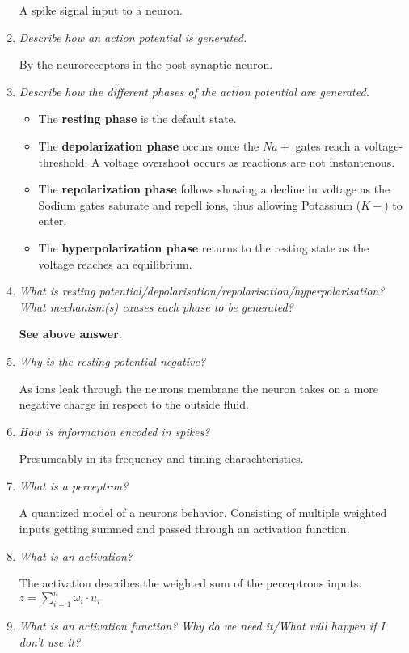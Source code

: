 \documentclass[
    fontsize      = 11pt,
    paper         = a4,
    twoside       = false,
    parskip       = half,
    pagesize      = false,
]{scrartcl}
\providecommand{\tightlist}{%
  \setlength{\itemsep}{0pt}\setlength{\parskip}{0pt}}
\begin{document}
\begin{enumerate}
  A spike signal input to a neuron.
\item
  \emph{Describe how an action potential is generated.}

  By the neuroreceptors in the post-synaptic neuron.
\item
  \emph{Describe how the different phases of the action potential are
  generated.}

  \begin{itemize}
  \tightlist
  \item
    The \textbf{resting phase} is the default state.
  \item
    The \textbf{depolarization phase} occurs once the \(Na+\) gates
    reach a voltage-threshold. A voltage overshoot occurs as reactions
    are not instantenous.
  \item
    The \textbf{repolarization phase} follows showing a decline in
    voltage as the Sodium gates saturate and repell ions, thus allowing
    Potassium (\(K-\)) to enter.
  \item
    The \textbf{hyperpolarization phase} returns to the resting state as
    the voltage reaches an equilibrium.
  \end{itemize}
\item
  \emph{What is resting
  potential/depolarisation/repolarisation/hyperpolarisation? What
  mechanism(s) causes each phase to be generated?}

  \textbf{See above answer}.
\item
  \emph{Why is the resting potential negative?}

  As ions leak through the neurons membrane the neuron takes on a more
  negative charge in respect to the outside fluid.
\item
  \emph{How is information encoded in spikes?}

  Presumeably in its frequency and timing charachteristics.
\item
  \emph{What is a perceptron?}

  A quantized model of a neurons behavior. Consisting of multiple
  weighted inputs getting summed and passed through an activation
  function.
\item
  \emph{What is an activation?}

  The activation describes the weighted sum of the perceptrons inputs.
  \(z = \sum_{i=1}^n \omega_i \cdot u_i\)
\item
  \emph{What is an activation function? Why do we need it/What will
  happen if I don't use it?}


\end{enumerate}
\end{document}
